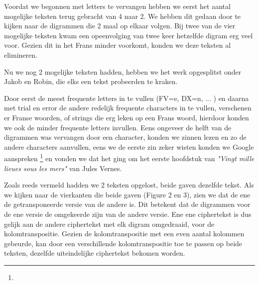Voordat we begonnen met letters te vervangen hebben we eerst het aantal mogelijke teksten terug gebracht van 4 naar 2. We hebben dit gedaan door te kijken naar de digrammen die 2 maal op elkaar volgen. Bij twee van de vier mogelijke teksten kwam een opeenvolging van twee keer hetzelfde digram erg veel voor. Gezien dit in het Frans minder voorkomt, konden we deze teksten al elimineren.

Nu we nog 2 mogelijke teksten hadden, hebben we het werk opgesplitst onder Jakob en Robin, die elks een tekst probeerden te kraken.

Door eerst de meest frequente letters in te vullen (FV=e, DX=n, ... ) en daarna met trial en error de andere redelijk frequente characters in te vullen, verschenen er Franse woorden, of strings die erg leken op een Frans woord, hierdoor konden we ook de minder frequente letters invullen. Eens ongeveer de helft van de digrammen was vervangen door een character, konden we zinnen lezen en zo de andere characters aanvullen, eens we de eerste zin zeker wisten konden we Google aanspreken \footnote{\googleSearch} en vonden we dat het ging om het eerste hoofdstuk van \textit{"Vingt mille lieues sous les mers"} van Jules Vernes.

Zoals reeds vermeld hadden we 2 teksten opgelost, beide gaven dezelfde tekst. Als we kijken naar de vierkanten die beide gaven (Figure 2 en 3), zien we dat de ene de getransponeerde versie van de andere is. Dit betekent dat de digrammen voor de ene versie de omgekeerde zijn van de andere versie. Ene ene ciphertekst is dus gelijk aan de andere ciphertekst met elk digram omgedraaid, voor de kolomtranspositie. Gezien de kolomtranspositie met een even aantal kolommen gebeurde, kan door een verschillende kolomtranspositie toe te passen op beide teksten, dezelfde uiteindelijke ciphertekst bekomen worden.

